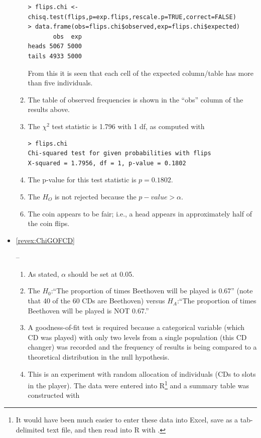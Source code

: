 \documentclass[10pt,openany]{book}\usepackage[]{graphicx}\usepackage[]{color}
\makeatletter
\newenvironment{kframe}{%
 \def\at@end@of@kframe{}%
 \ifinner\ifhmode%
  \def\at@end@of@kframe{\end{minipage}}%
  \begin{minipage}{\columnwidth}%
 \fi\fi%
 \def\FrameCommand##1{\hskip\@totalleftmargin \hskip-\fboxsep
 \colorbox{shadecolor}{##1}\hskip-\fboxsep
     \hskip-\linewidth \hskip-\@totalleftmargin \hskip\columnwidth}%
 \MakeFramed {\advance\hsize-\width
   \@totalleftmargin\z@ \linewidth\hsize
   \@setminipage}}%
 {\par\unskip\endMakeFramed%
 \at@end@of@kframe}
\newenvironment{knitrout}{}{} %
\makeatother
\begin{document}
\begin{itemize}
\begin{enumerate}
\begin{knitrout}
\begin{kframe}
\begin{verbatim}
> flips.chi <- chisq.test(flips,p=exp.flips,rescale.p=TRUE,correct=FALSE)
> data.frame(obs=flips.chi$observed,exp=flips.chi$expected)
       obs  exp
heads 5067 5000
tails 4933 5000
\end{verbatim}
\end{kframe}
\end{knitrout}
From this it is seen that each cell of the expected column/table has more than five individuals.
      \item The table of observed frequencies is shown in the ``obs'' column of the results above.
      \item The $\chi^{2}$ test statistic is 1.796 with 1 df, as computed with
\begin{knitrout}
\color{fgcolor}\begin{kframe}
\begin{verbatim}
> flips.chi
Chi-squared test for given probabilities with flips 
X-squared = 1.7956, df = 1, p-value = 0.1802
\end{verbatim}
\end{kframe}
\end{knitrout}
      \item The p-value for this test statistic is $p=0.1802$.
      \item The $H_{O}$ is not rejected because the $p-value>\alpha$.
      \item The coin appears to be fair; i.e., a head appears in approximately half of the coin flips.
    \end{enumerate}
  \item \hypertarget{ans:ChiGOFCD}{\ref{revex:ChiGOFCD}} --
    \begin{enumerate}
      \item As stated, $\alpha$ should be set at 0.05.
      \item The $H_{0}$:``The proportion of times Beethoven will be played is 0.67'' (note that 40 of the 60 CDs are Beethoven) versus $H_{A}$:``The proportion of times Beethoven will be played is NOT 0.67.''
      \item A goodness-of-fit test is required because a categorical variable (which CD was played) with only two levels from a single population (this CD changer) was recorded and the frequency of results is being compared to a theoretical distribution in the null hypothesis.
      \item This is an experiment with random allocation of individuals (CDs to slots in the player).  The data were entered into R\footnote{It would have been much easier to enter these data into Excel, save as a tab-delimited text file, and then read into R with .} and a summary table was constructed with

\end{enumerate}
\end{itemize}
\end{document}
